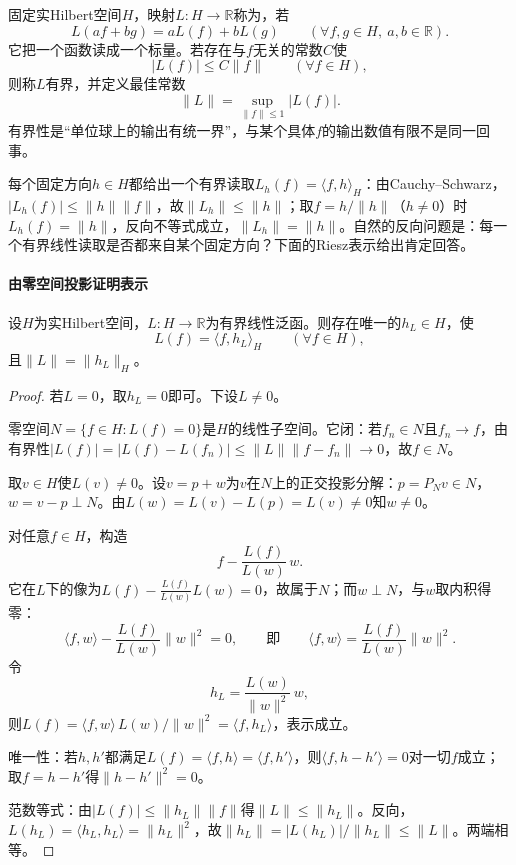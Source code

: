固定实Hilbert空间$H$，映射$L:H\to\mathbb R$称为，若
\[
L(af+bg)=aL(f)+bL(g)\qquad(\forall f,g\in H,\ a,b\in\mathbb R).
\]
它把一个函数读成一个标量。若存在与$f$无关的常数$C$使
\[
|L(f)|\le C\|f\|\qquad(\forall f\in H),
\]
则称$L$有界，并定义最佳常数
\[
\|L\|=\sup_{\|f\|\le1}|L(f)|.
\]
有界性是“单位球上的输出有统一界”，与某个具体$f$的输出数值有限不是同一回事。

每个固定方向$h\in H$都给出一个有界读取$L_h(f)=\langle f,h\rangle_H$：由Cauchy–Schwarz，$|L_h(f)|\le\|h\|\|f\|$，故$\|L_h\|\le\|h\|$；取$f=h/\|h\|$（$h\ne0$）时$L_h(f)=\|h\|$，反向不等式成立，$\|L_h\|=\|h\|$。自然的反向问题是：每一个有界线性读取是否都来自某个固定方向？下面的Riesz表示给出肯定回答。

\paragraph{由零空间投影证明表示}

\begin{theorem}[Riesz表示]
\label{thm:riesz}
设$H$为实Hilbert空间，$L:H\to\mathbb R$为有界线性泛函。则存在唯一的$h_L\in H$，使
\begin{equation}
\label{eq:functional-riesz-representation}
L(f)=\langle f,h_L\rangle_H\qquad(\forall f\in H),
\end{equation}
且$\|L\|=\|h_L\|_H$。
\end{theorem}

\begin{proof}
若$L=0$，取$h_L=0$即可。下设$L\ne0$。

零空间$N=\{f\in H:L(f)=0\}$是$H$的线性子空间。它闭：若$f_n\in N$且$f_n\to f$，由有界性$|L(f)|=|L(f)-L(f_n)|\le\|L\|\|f-f_n\|\to0$，故$f\in N$。

取$v\in H$使$L(v)\ne0$。设$v=p+w$为$v$在$N$上的正交投影分解：$p=P_Nv\in N$，$w=v-p\perp N$。由$L(w)=L(v)-L(p)=L(v)\ne0$知$w\ne0$。

对任意$f\in H$，构造
\[
f-\frac{L(f)}{L(w)}\,w.
\]
它在$L$下的像为$L(f)-\frac{L(f)}{L(w)}L(w)=0$，故属于$N$；而$w\perp N$，与$w$取内积得零：
\[
\langle f,w\rangle-\frac{L(f)}{L(w)}\|w\|^2=0,
\qquad\text{即}\qquad
\langle f,w\rangle=\frac{L(f)}{L(w)}\|w\|^2.
\]
令
\begin{equation}
\label{eq:functional-riesz-direction}
h_L=\frac{L(w)}{\|w\|^2}\,w,
\end{equation}
则$L(f)=\langle f,w\rangle\,L(w)/\|w\|^2=\langle f,h_L\rangle$，表示成立。

唯一性：若$h,h'$都满足$L(f)=\langle f,h\rangle=\langle f,h'\rangle$，则$\langle f,h-h'\rangle=0$对一切$f$成立；取$f=h-h'$得$\|h-h'\|^2=0$。

范数等式：由$|L(f)|\le\|h_L\|\|f\|$得$\|L\|\le\|h_L\|$。反向，$L(h_L)=\langle h_L,h_L\rangle=\|h_L\|^2$，故$\|h_L\|=|L(h_L)|/\|h_L\|\le\|L\|$。两端相等。
\end{proof}

